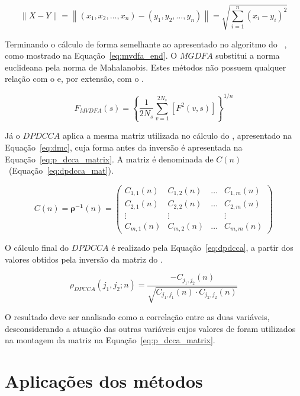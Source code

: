 \begin{equation}\label{eq:euclidean_norm}
    \|X-Y\|=\left\|\left(x_1, x_2, \ldots, x_n\right)-\left(y_1, y_2, \ldots, y_n\right)\right\|=\sqrt{\sum_{i=1}^n\left(x_i-y_i\right)^2}
\end{equation}

Terminando o cálculo de forma semelhante ao apresentado no algoritmo do \dfa~, como mostrado na Equação~\ref{eq:mvdfa_end}. O $MGDFA$ substitui a norma euclideana pela norma de Mahalanobis. Estes métodos não possuem qualquer relação com o \dcca e, por extensão, com o \pdcca.

\begin{equation}\label{eq:mvdfa_end}
    F_{M V D F A}(s)=\left\{\frac{1}{2 N_s} \sum_{v=1}^{2 N_s}\left[F^2(v, s)\right]\right\}^{1 / n}
\end{equation}

Já o $DPDCCA$ aplica a mesma matriz utilizada no cálculo do \dmc, apresentado na Equação~\ref{eq:dmc}, cuja forma antes da inversão é apresentada na Equação~\ref{eq:p_dcca_matrix}. A matriz é denominada de $C(n)$~(Equação~\ref{eq:dpdcca_mat}). 


\begin{equation}\label{eq:dpdcca_mat}
  C(n)=\boldsymbol{\rho}^{-\mathbf{1}}(n)=\left(\begin{matrix}
  C_{1,1}(n) & C_{1,2}(n) & \ldots & 
  C_{1, m}(n) \\
  C_{2,1}(n) & C_{2,2}(n) & \ldots & C_{2, m}(n) \\
  \vdots & \vdots & & \vdots \\
  C_{m, 1}(n) & C_{m, 2}(n) & \ldots & C_{m, m}(n)
  \end{matrix}\right)
\end{equation}

O cálculo final do $DPDCCA$ é realizado pela Equação~\ref{eq:dpdcca}, a partir dos valores obtidos pela inversão da matriz do \pdcca.

\begin{equation}\label{eq:dpdcca}
  \rho_{D P C C A}\left(j_1, j_2 ; n\right)=\frac{-C_{j_1, j_2}(n)}{\sqrt{C_{j_1, j_1}(n) \cdot C_{j_2, j_2}(n)}}
\end{equation}

O resultado deve ser analisado como a correlação entre as duas variáveis, desconsiderando a atuação das outras variáveis cujos valores de \pdcca foram utilizados na montagem da matriz na Equação~\ref{eq:p_dcca_matrix}.

\section{Aplicações dos métodos}
\label{ss:aplica}